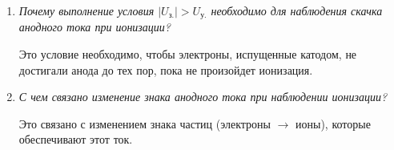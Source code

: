 \documentclass[a4paper]{article}
\begin{document}
\begin{enumerate}
    \item {\it Почему выполнение условия $|U_\text{з.}| > U_\text{у.}$
    необходимо для наблюдения скачка анодного тока при ионизации?}

    Это условие необходимо, чтобы электроны, испущенные катодом,
    не достигали анода до тех пор, пока не произойдет ионизация.
    
    \item {\it С чем связано изменение знака анодного тока при наблюдении ионизации?}
    
    Это связано с изменением знака частиц (электроны $\rightarrow$ ионы), которые обеспечивают этот ток.
\end{enumerate}
\end{document}
